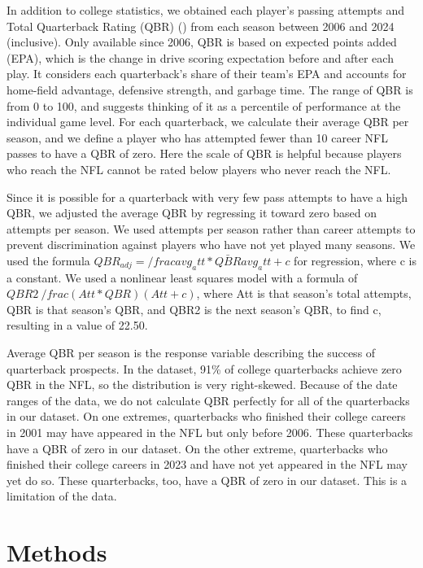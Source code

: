 \documentclass[Review, sageh, times]{sagej}
\begin{document}
In addition to college statistics, we obtained each player's passing attempts and Total Quarterback Rating (QBR) (\cite{burke_how_2016}) from each season between 2006 and 2024 (inclusive). Only available since 2006, QBR is based on expected points added (EPA), which is the change in drive scoring expectation before and after each play. It considers each quarterback's share of their team's EPA and accounts for home-field advantage, defensive strength, and garbage time. The range of QBR is from 0 to 100, and \textcite{burke_how_2016} suggests thinking of it as a percentile of performance at the individual game level. For each quarterback, we calculate their average QBR per season, and we define a player who has attempted fewer than 10 career NFL passes to have a QBR of zero. Here the scale of QBR is helpful because players who reach the NFL cannot be rated below players who never reach the NFL. 

Since it is possible for a quarterback with very few pass attempts to have a high QBR, we adjusted the average QBR by regressing it toward zero based on attempts per season. We used attempts per season rather than career attempts to prevent discrimination against players who have not yet played many seasons. We used the formula $QBR_{adj}=/frac{avg_att*\bar{QBR}}{avg_att+c}$ for regression, where c is a constant. We used a nonlinear least squares model with a formula of $QBR2~/frac{(Att * QBR)}{(Att + c)}$, where Att is that season's total attempts, QBR is that season's QBR, and QBR2 is the next season's QBR, to find c, resulting in a value of 22.50. 

Average QBR per season is the response variable describing the success of quarterback prospects. In the dataset, 91\% of college quarterbacks achieve zero QBR in the NFL, so the distribution is very right-skewed. Because of the date ranges of the data, we do not calculate QBR perfectly for all of the quarterbacks in our dataset. On one extremes, quarterbacks who finished their college careers in 2001 may have appeared in the NFL but only before 2006. These quarterbacks have a QBR of zero in our dataset. On the other extreme, quarterbacks who finished their college careers in 2023 and have not yet appeared in the NFL may yet do so. These quarterbacks, too, have a QBR of zero in our dataset. This is a limitation of the data.

\section{Methods}
\label{sec:methods}
\end{document}
